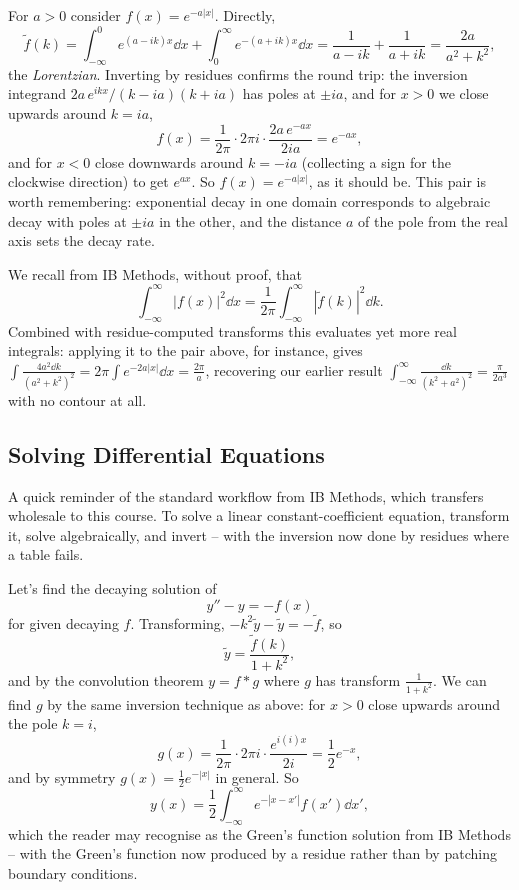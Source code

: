 \begin{example}
	For $a > 0$ consider $f(x) = e^{-a|x|}$. Directly,
	$$
	\tilde f(k) = \int_{-\infty}^0 e^{(a - ik)x} \dd x + \int_0^\infty e^{-(a + ik)x} \dd x = \frac{1}{a - ik} + \frac{1}{a + ik} = \frac{2a}{a^2 + k^2},
	$$
	the \emph{Lorentzian}. Inverting by residues confirms the round trip: the inversion integrand $2a\, e^{ikx}/(k - ia)(k + ia)$ has poles at $\pm ia$, and for $x > 0$ we close upwards around $k = ia$,
	$$
	f(x) = \frac{1}{2\pi} \cdot 2\pi i \cdot \frac{2a\, e^{-ax}}{2ia} = e^{-ax},
	$$
	and for $x < 0$ close downwards around $k = -ia$ (collecting a sign for the clockwise direction) to get $e^{ax}$. So $f(x) = e^{-a|x|}$, as it should be. This pair is worth remembering: exponential decay in one domain corresponds to algebraic decay with poles at $\pm ia$ in the other, and the distance $a$ of the pole from the real axis sets the decay rate.
\end{example}

\begin{remark}
	We recall from IB Methods, without proof, that
	$$
	\int_{-\infty}^\infty |f(x)|^2 \dd x = \frac{1}{2\pi} \int_{-\infty}^\infty |\tilde f(k)|^2 \dd k.
	$$
	Combined with residue-computed transforms this evaluates yet more real integrals: applying it to the pair above, for instance, gives $\int \frac{4a^2 \dd k}{(a^2 + k^2)^2} = 2\pi \int e^{-2a|x|}\dd x = \frac{2\pi}{a}$, recovering our earlier result $\int_{-\infty}^{\infty} \frac{\dd k}{(k^2 + a^2)^2} = \frac{\pi}{2a^3}$ with no contour at all.
\end{remark}

\subsection{Solving Differential Equations}

A quick reminder of the standard workflow from IB Methods, which transfers wholesale to this course. To solve a linear constant-coefficient equation, transform it, solve algebraically, and invert -- with the inversion now done by residues where a table fails.

\begin{example}
	Let's find the decaying solution of
	$$
	y'' - y = -f(x)
	$$
	for given decaying $f$. Transforming, $-k^2 \tilde y - \tilde y = -\tilde f$, so
	$$
	\tilde y = \frac{\tilde f(k)}{1 + k^2},
	$$
	and by the convolution theorem $y = f * g$ where $g$ has transform $\frac{1}{1 + k^2}$. We can find $g$ by the same inversion technique as above: for $x > 0$ close upwards around the pole $k = i$,
	$$
	g(x) = \frac{1}{2\pi} \cdot 2\pi i \cdot \frac{e^{i(i)x}}{2i} = \frac{1}{2} e^{-x},
	$$
	and by symmetry $g(x) = \frac 12 e^{-|x|}$ in general. So
	$$
	y(x) = \frac{1}{2}\int_{-\infty}^\infty e^{-|x - x'|} f(x') \dd x',
	$$
	which the reader may recognise as the Green's function solution from IB Methods -- with the Green's function now produced by a residue rather than by patching boundary conditions.
\end{example}

